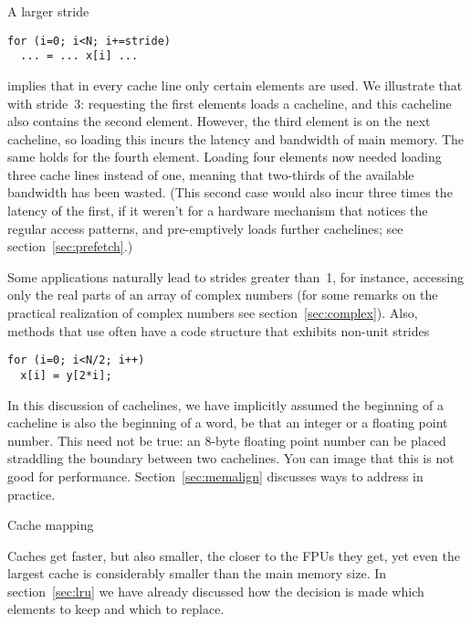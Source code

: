 %
A larger stride 
\begin{lstlisting}
for (i=0; i<N; i+=stride)
  ... = ... x[i] ...
\end{lstlisting}
implies that in every cache line only certain elements
are used. We illustrate that with stride~3: requesting the first
elements loads a cacheline, and this cacheline also contains the
second element. However, the third element is on the next cacheline,
so loading this incurs the latency and bandwidth of main memory. The
same holds for the fourth element. Loading four elements now needed
loading three cache lines instead of one, meaning that two-thirds of
the available bandwidth has been wasted. (This second case would also incur
three times the latency of the first, if it weren't for a hardware
mechanism that notices the regular access patterns, and pre-emptively
loads further cachelines; see section~\ref{sec:prefetch}.)

Some applications naturally lead to strides greater than~1, for
instance, accessing only the real parts of an array of complex
numbers (for some remarks on the practical realization of complex
numbers see section~\ref{sec:complex}). Also, methods that use
 often have a code structure that
exhibits non-unit strides
\begin{lstlisting}
for (i=0; i<N/2; i++)
  x[i] = y[2*i];
\end{lstlisting}


In this discussion of cachelines, we have implicitly assumed the
beginning of a cacheline is also the beginning of a word, be that an
integer or a floating point number. This need not be true: an 8-byte
floating point number can be placed straddling the boundary between
two cachelines. You can image that this is not good for
performance. Section~\ref{sec:memalign} discusses ways to address
in practice.


 {Cache mapping}

Caches get faster, but also smaller, the closer to the \acp{FPU} they
get, yet even the largest cache is considerably smaller than the main
memory size. In section~\ref{sec:lru} we have already discussed how
the decision is made which elements to keep and which to replace.

